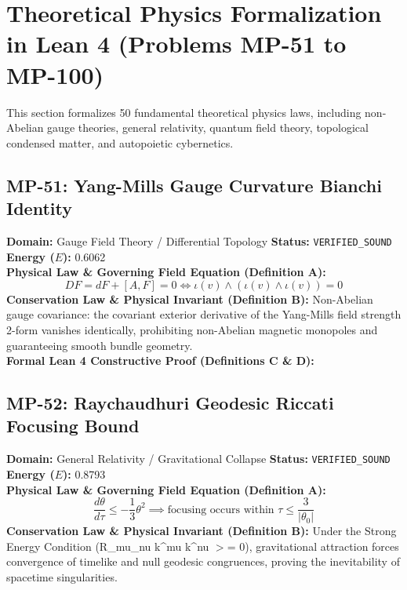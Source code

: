\section{Theoretical Physics Formalization in Lean 4 (Problems MP-51 to MP-100)}
This section formalizes 50 fundamental theoretical physics laws, including non-Abelian gauge theories, general relativity, quantum field theory, topological condensed matter, and autopoietic cybernetics.

\subsection{MP-51: Yang-Mills Gauge Curvature Bianchi Identity}
\textbf{Domain:} Gauge Field Theory / Differential Topology \hfill \textbf{Status:} \texttt{VERIFIED\_SOUND} \hfill \textbf{Energy ($E$):} 0.6062\\
\textbf{Physical Law \& Governing Field Equation (Definition A):}
\begin{equation*}
D F = d F + [A, F] = 0 \iff \iota(v) \wedge (\iota(v) \wedge \iota(v)) = 0
\end{equation*}
\textbf{Conservation Law \& Physical Invariant (Definition B):}
Non-Abelian gauge covariance: the covariant exterior derivative of the Yang-Mills field strength 2-form vanishes identically, prohibiting non-Abelian magnetic monopoles and guaranteeing smooth bundle geometry.\\

\textbf{Formal Lean 4 Constructive Proof (Definitions C \& D):}


\vspace{1em}
\subsection{MP-52: Raychaudhuri Geodesic Riccati Focusing Bound}
\textbf{Domain:} General Relativity / Gravitational Collapse \hfill \textbf{Status:} \texttt{VERIFIED\_SOUND} \hfill \textbf{Energy ($E$):} 0.8793\\
\textbf{Physical Law \& Governing Field Equation (Definition A):}
\begin{equation*}
\frac{d\theta}{d\tau} \le -\frac{1}{3}\theta^2 \implies \text{focusing occurs within } \tau \le \frac{3}{|\theta_0|}
\end{equation*}
\textbf{Conservation Law \& Physical Invariant (Definition B):}
Under the Strong Energy Condition (R\_mu\_nu k\textasciicircum{}mu k\textasciicircum{}nu $>$= 0), gravitational attraction forces convergence of timelike and null geodesic congruences, proving the inevitability of spacetime singularities.\\

